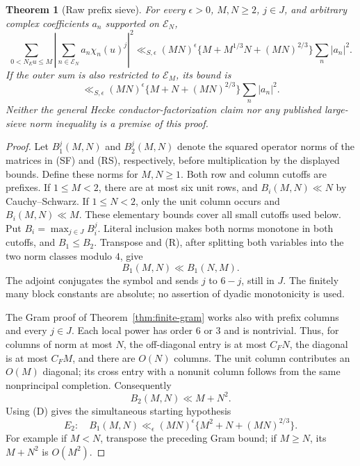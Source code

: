 \documentclass[11pt]{article}
\newtheorem{theorem}{Theorem}
\theoremstyle{remark}\newtheorem{remark}[theorem]{Remark}
\begin{document}
\begin{theorem}[Raw prefix sieve]\label{thm:raw-sieve}
For every $\epsilon>0$, $M,N\ge2$, $j\in J$, and arbitrary complex
coefficients $a_n$ supported on $\mathcal E_N$,
\[
 \sum_{0<N_Eu\le M}
 \left|\sum_{n\in\mathcal E_N}a_n\chi_n(u)^j\right|^2
 \ll_{S,\epsilon}(MN)^\epsilon
 \{M+M^{1/3}N+(MN)^{2/3}\}\sum_n|a_n|^2.          \tag{RS}
\]
If the outer sum is also restricted to $\mathcal E_M$, its bound is
\[
 \ll_{S,\epsilon}(MN)^\epsilon
 \{M+N+(MN)^{2/3}\}\sum_n|a_n|^2.                \tag{SF}
\]
Neither the general Hecke conductor-factorization claim nor any
published large-sieve norm inequality is a premise of this proof.
\end{theorem}
\begin{proof}
Let $B_1^j(M,N)$ and $B_2^j(M,N)$ denote the squared operator norms of
the matrices in (SF) and (RS), respectively, before multiplication
by the displayed bounds. Define these norms for $M,N\ge1$.
Both row and column cutoffs are prefixes.
If $1\le M<2$, there are at most six unit rows, and
$B_i(M,N)\ll N$ by Cauchy--Schwarz.
If $1\le N<2$, only the unit column occurs and $B_i(M,N)\ll M$.
These elementary bounds cover all small cutoffs used below.
Put $B_i=\max_{j\in J}B_i^j$.
Literal inclusion makes both norms monotone in both cutoffs, and
$B_1\le B_2$. Transpose and (R), after splitting both variables into
the two norm classes modulo $4$, give
\[
 B_1(M,N)\ll B_1(N,M).                            \tag{D}
\]
The adjoint conjugates the symbol and sends $j$ to $6-j$, still in
$J$. The finitely many block constants are absolute; no assertion
of dyadic monotonicity is used.

The Gram proof of Theorem~\ref{thm:finite-gram} works also with
prefix columns and every $j\in J$. Each local power has order $6$
or $3$ and is nontrivial. Thus, for columns of norm at most $N$,
the off-diagonal entry is at most $C_FN$, the diagonal is at most
$C_FM$, and there are $O(N)$ columns. The unit column contributes
an $O(M)$ diagonal; its cross entry with a nonunit column follows
from the same nonprincipal completion. Consequently
\[
 B_2(M,N)\ll M+N^2.
\]
Using (D) gives the simultaneous starting hypothesis
\[
 E_2:\quad B_1(M,N)\ll_\epsilon(MN)^\epsilon
 \{M^2+N+(MN)^{2/3}\}.                            \tag{E2}
\]
For example if $M<N$, transpose the preceding Gram bound; if
$M\ge N$, its $M+N^2$ is $O(M^2)$.


\end{proof}
\end{document}
